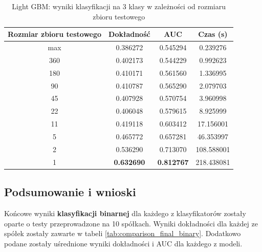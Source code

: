 \documentclass[a4paper, twoside, 11pt, openright]{article}
\begin{document}
\begin{table}[H]
    \centering
    \begin{tabular}{|c|c|c|c|}
    \hline
        \textbf{Rozmiar zbioru testowego} & \textbf{Dokładność} & \textbf{AUC} & \textbf{Czas (s)} \\ \hline
max   						 &  0.386272 &  0.545294 &    0.239276 \\ \hline
360                         &  0.402173 &  0.544229 &    0.992623 \\ \hline
180                         &  0.410171 &  0.561560 &    1.336995 \\ \hline
90                         &  0.410787 &  0.565290 &    2.079703 \\ \hline
45                          &  0.407928 &  0.570754 &    3.960998 \\ \hline
22                          &  0.406048 &  0.579615 &    8.925999 \\ \hline
11                          &  0.419118 &  0.603412 &   17.156001 \\ \hline
5                           &  0.465772 &  0.657281 &   46.353997 \\ \hline
2                           &  0.536290 &  0.713070 &  108.588001 \\ \hline
1                           &  \textbf{0.632690} &  \textbf{0.812767} &  218.438081 \\ \hline
    \end{tabular}
    \caption{Light GBM: wyniki klasyfikacji na 3 klasy w zależności od rozmiaru zbioru testowego}
    \label{tab:lgbm_walk_forward_discrete}
\end{table}

\subsection{Podsumowanie i wnioski}

Końcowe wyniki \textbf{klasyfikacji binarnej} dla każdego z klasyfikatorów zostały oparte o testy przeprowadzone na 10 spółkach. Wyniki dokładności dla każdej ze spółek zostały zawarte w tabeli \ref{tab:comparison_final_binary}. Dodatkowo podane zostały uśrednione wyniki dokładności i AUC dla każdego z modeli. 

\end{document}
